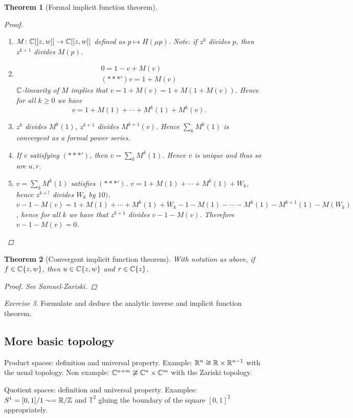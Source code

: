 \documentclass[A4paper, british, reqno]{amsart}
\theoremstyle{darkgreentheorem}
\newtheorem{thm}{Theorem}[section]
\theoremstyle{darkbluedefinition}
\theoremstyle{darkredexample}
\theoremstyle{remark}
\newtheorem{exe}[thm]{Exercise}
\newcommand{\1}{\mathbbm{1}}
\begin{document}
\begin{thm}[Formal implicit function theorem]
\begin{proof}
\begin{enumerate}[label=\arabic*)]
\begin{multline*}
	    \end{multline*}
	\item $M\colon \mathbb{C}[[z,w]]\to \mathbb{C}[[z,w]]$ defined as $p\mapsto H(\mu p)$.
	    Note: if $z^{k}$ divides $p$, then $z^{k+1}$ divides $M(p)$.
	\item \begin{multline*}
		0=1-v+M(v) \\
		(***') v=1+M(v)
	    \end{multline*}
		$\mathbb{C}$-linearity of $M$ implies that $v=1+M(v)=1+M(1+M(v))$.
		Hence for all $k\geqslant 0$ we have
		\[ v=1+M(1)+\cdots +M^{k}(1)+M^{k}(v). \]
	\item $z^{k}$ divides $M^{k}(1)$, $z^{k+1}$ divides $M^{k+1}(v)$.
	    Hence $\sum_{k}M^{k}(1)$ is convergent as a formal power series.
	\item If $v$ satisfying $(***')$, then $v=\sum_{k}M^{k}(1)$.
	    Hence $v$ is unique and thus so are $u, r$.
	\item $v=\sum_{k}M^{k}(1)$ satisfies $(***')$.
	    $v=1+M(1)+\cdots +M^{k}(1)+W_{k}$, hence $z^{k+!}$ divides $W_{k}$ by $10)$.
		$v-1-M(v)=1+M(1)+\cdots +M^{k}(1)+W_{k}-1-M(1)-\cdots -M^{k}(1)-M^{k+1}(1)-M(W_{k})$, hence for all $k$ we have that $z^{k+1}$ divides $v-1-M(v)$.
		Therefore $v-1-M(v)=0$.
	\end{enumerate}
    \end{proof}
\end{thm}

\begin{thm}[Convergent implicit function theorem]
    With notation as above, if $f\in \mathbb{C}\{z,w\}$, then $u\in \mathbb{C}\{z,w\}$ and $r\in \mathbb{C}\{z\}$.
    \begin{proof}
	See Samuel-Zariski.
    \end{proof}
\end{thm}

\begin{exe}
    Formulate and deduce the analytic inverse and implicit function theorem.
\end{exe}

\subsection{More basic topology}

Product spaces: definition and universal property.
Example: $\mathbb{R}^{n}\cong \mathbb{R}\times \mathbb{R}^{n-1}$ with the usual topology.
Non example: $\mathbb{C}^{n+m}\not\cong \mathbb{C}^{n}\times \mathbb{C}^{m}$ with the Zariski topology.

Quotient spaces: definition and universal property.
Examples: $S^{1}=[0,1]/1\sim =\mathbb{R}/\mathbb{Z}$ and $\mathbb{T}^{2}$ gluing the boundary of the square $[0,1]^{2}$ appropriately.
\end{document}
